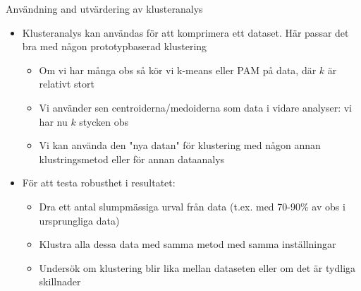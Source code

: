 \documentclass[10pt,english]{beamer}
\begin{document}
\begin{frame}{Användning and utvärdering av klusteranalys}

    \begin{itemize}
        
        
        \item Klusteranalys kan användas för att komprimera ett dataset. Här passar det bra med någon prototypbaserad klustering
        \begin{itemize}
            \item Om vi har många obs så kör vi k-means eller PAM på data, där $k$ är relativt stort
            \item Vi använder sen centroiderna/medoiderna som data i vidare analyser: vi har nu $k$ stycken obs
            \item Vi kan använda den "nya datan" för klustering med någon annan klustringsmetod eller för annan dataanalys
        \end{itemize}
        
        
        \item För att testa robusthet i resultatet:
        \begin{itemize}
          \item Dra ett antal slumpmässiga urval från data (t.ex. med 70-90\% av obs i ursprungliga data) 
          \item Klustra alla dessa data med samma metod med samma inställningar
          \item Undersök om klustering blir lika mellan dataseten eller om det är tydliga skillnader
        \end{itemize}
    \end{itemize}
    
\end{frame}
\end{document}
